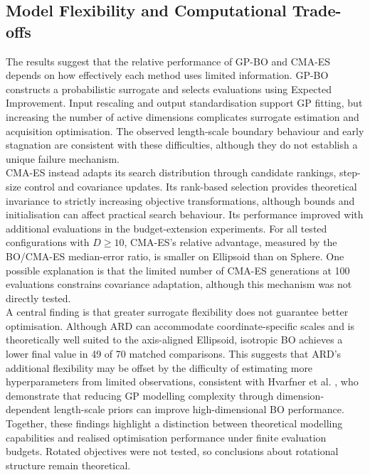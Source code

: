 \documentclass[11pt]{article}
\begin{document}
\subsection{Model Flexibility and Computational Trade-offs}
The results suggest that the relative performance of GP-BO and CMA-ES depends on how effectively each method uses limited information. GP-BO constructs a probabilistic surrogate and selects evaluations using Expected Improvement. Input rescaling and output standardisation support GP fitting, but increasing the number of active dimensions complicates surrogate estimation and acquisition optimisation. The observed length-scale boundary behaviour and early stagnation are consistent with these difficulties, although they do not establish a unique failure mechanism. \\

\noindent CMA-ES instead adapts its search distribution through candidate rankings, step-size control and covariance updates. Its rank-based selection provides theoretical invariance to strictly increasing objective transformations, although bounds and initialisation can affect practical search behaviour. Its performance improved with additional evaluations in the budget-extension experiments. For all tested configurations with $D \geq 10$, CMA-ES's relative advantage, measured by the BO/CMA-ES median-error ratio, is smaller on Ellipsoid than on Sphere. One possible explanation is that the limited number of CMA-ES generations at 100 evaluations constrains covariance adaptation, although this mechanism was not directly tested. \\

\noindent A central finding is that greater surrogate flexibility does not guarantee better optimisation. Although ARD can accommodate coordinate-specific scales and is theoretically well suited to the axis-aligned Ellipsoid, isotropic BO achieves a lower final value in 49 of 70 matched comparisons. This suggests that ARD's additional flexibility may be offset by the difficulty of estimating more hyperparameters from limited observations, consistent with Hvarfner et al. \cite{hvarfner2024vanilla}, who demonstrate that reducing GP modelling complexity through dimension-dependent length-scale priors can improve high-dimensional BO performance. Together, these findings highlight a distinction between theoretical modelling capabilities and realised optimisation performance under finite evaluation budgets. Rotated objectives were not tested, so conclusions about rotational structure remain theoretical.
\end{document}
